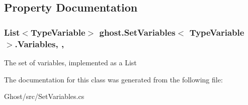 \subsection{Property Documentation}
\hypertarget{classghost_1_1SetVariables_3_01TypeVariable_01_4_a1aa6a24ebcf2782dbd09e186e5c000d8}{
\subsubsection[{Variables}]{\setlength{\rightskip}{0pt plus 5cm}List$<$Type\-Variable$>$ ghost.\-Set\-Variables$<$ Type\-Variable $>$.Variables\hspace{0.3cm}{\ttfamily [get]}, {\ttfamily [set]}, {\ttfamily [protected]}}}\label{classghost_1_1SetVariables_3_01TypeVariable_01_4_a1aa6a24ebcf2782dbd09e186e5c000d8}
The set of variables, implemented as a List 

The documentation for this class was generated from the following file\-:\begin{DoxyCompactItemize}
\item 
Ghost/src/Set\-Variables.\-cs\end{DoxyCompactItemize}
